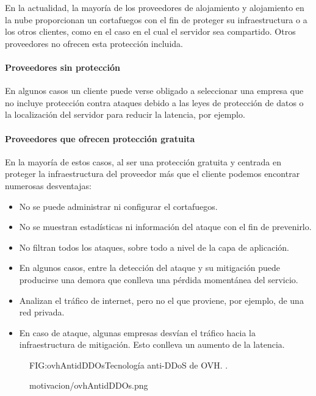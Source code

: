 En la actualidad, la mayoría de los proveedores de alojamiento y alojamiento en la nube proporcionan un cortafuegos \cite{mayoriaAntiddos} con el fin de proteger su infraestructura o a los otros clientes, como en el caso en el cual el servidor sea compartido. Otros proveedores no ofrecen esta protección incluida. \cite{clubvps}

\paragraph{Proveedores sin protección}
En algunos casos un cliente puede verse obligado a seleccionar una empresa que no incluye protección contra ataques debido a las leyes de protección de datos o la localización del servidor para reducir la latencia, por ejemplo.

\paragraph{Proveedores que ofrecen protección gratuita}
En la mayoría de estos casos, al ser una protección gratuita y centrada en proteger la infraestructura del proveedor más que el cliente podemos encontrar numerosas desventajas:
\begin{itemize}
\item No se puede administrar ni configurar el cortafuegos. \cite{atq1}
\item No se muestran estadísticas ni información del ataque con el fin de prevenirlo. \cite{mtvtonlinesas} 
\item No filtran todos los ataques, sobre todo a nivel de la capa de aplicación. \cite{atq2} 
\item En algunos casos, entre la detección del ataque y su mitigación puede producirse una demora que conlleva una pérdida momentánea del servicio. \cite{ovhAntidDDOs}
\item Analizan el tráfico de internet, pero no el que proviene, por ejemplo, de una red privada. \cite{ovhAntidDDOs}
\item En caso de ataque, algunas empresas desvían el tráfico hacia la infraestructura de mitigación. Esto conlleva un aumento de la latencia. \cite{ovhAntidDDOs}
\end{itemize} 
\begin{figure}[Tecnología anti-DDoS de OVH.]{FIG:ovhAntidDDOs}{Tecnología anti-DDoS de OVH. \cite{ovhAntidDDOs}.}
  \begin{image}{}{}{motivacion/ovhAntidDDOs.png}
  \end{image}
\end{figure}
